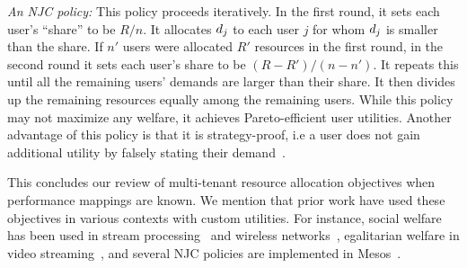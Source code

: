 \emph{An NJC policy:}
This policy proceeds iteratively.
In the first round, it sets each user's ``share'' to be $R/n$.
It allocates $d_{j}$ to each user $j$ for whom $d_{j}$ is smaller than the share.
If $n'$ users were allocated $R'$ resources in the first round, in the second round it
sets each user's share to be $(R-R')/(n-n')$.
It repeats this until all the remaining
users' demands are  larger than their share.
It then divides up the remaining resources equally among the remaining users.
While this policy may not maximize any welfare, it achieves Pareto-efficient user utilities. Another advantage 
 of this policy 
is that it is strategy-proof, i.e a user does not gain additional utility by falsely
stating their demand~\cite{ghodsi2011dominant,gutman2012fair,kandasamy20online}. 


This concludes our review of multi-tenant resource allocation objectives when performance mappings
are known.
We mention that prior work have used these objectives in
various contexts with custom utilities.
For instance, social welfare has been used in stream processing~\cite{kalim2018henge}
and wireless networks~\cite{tun2019wireless},
egalitarian welfare in video streaming~\cite{nathan2019end},
and several NJC policies are implemented in Mesos~\cite{hindman2011mesos}.


